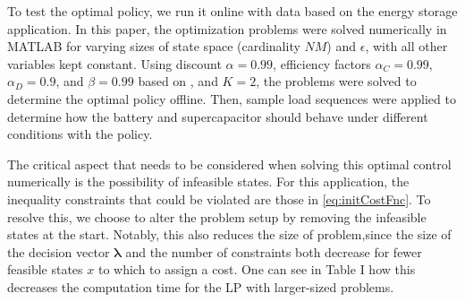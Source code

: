 \documentclass[conference]{IEEEtran}
\begin{document}


To test the optimal policy, we run it online with data based on the energy storage application. In this paper, the optimization problems were solved numerically in MATLAB for varying sizes of state space (cardinality $NM$) and $\epsilon$, with all other variables kept constant. Using discount $\alpha=0.99$, efficiency factors $\alpha_{C}=0.99$, $\alpha_{D}=0.9$, and $\beta=0.99$ based on \cite{su2013modeling}, and $K=2$, the problems were solved to determine the optimal policy offline. Then, sample load sequences were applied to determine how the battery and supercapacitor should behave under different conditions with the policy.

The critical aspect that needs to be considered when solving this optimal control numerically is the possibility of infeasible states. For this application, the inequality constraints that could be violated are those in \eqref{eq:initCostFnc}. To resolve this, we choose to alter the problem setup by removing the infeasible states at the start. Notably, this also reduces the size of problem,since the size of the decision vector $\boldsymbol{\lambda}$ and the number of constraints both decrease for fewer feasible states $x$ to which to assign a cost. One can see in Table I how this decreases the computation time for the LP with larger-sized problems.
\end{document}
